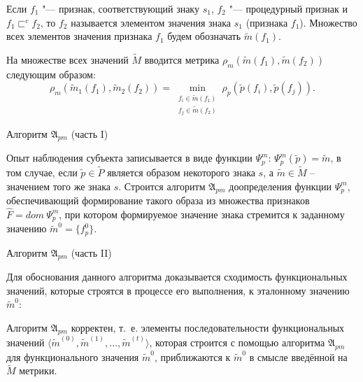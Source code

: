 \begin{Def}
	Если $f_1$ "--- признак, соответствующий знаку $s_1$, $f_2$ "--- процедурный признак и $f_1\sqsubset^c f_2$, то $f_2$ называется элементом значения знака $s_1$ (признака $f_1$). Множество всех элементов значения признака $f_1$ будем обозначать $\tilde m(f_1)$.
\end{Def}

На множестве всех значений $\tilde M$ вводится метрика $\rho_m(\tilde m(f_1),\tilde m(f_2))$ следующим образом:
\[
\rho_m(\tilde m_1(f_1),\tilde m_2(f_2 ))=\min\limits_{\substack{f_i\in\tilde m(f_1 )\\f_j\in\tilde m(f_2 )}}\rho_p(\tilde p(f_i ),\tilde p(f_j )).
\]

\begin{algorithm}[hS]
	\caption{Алгоритм $\mathfrak{A}_{pm}$ (часть I)}
	\label{alg:cycle_pm_start}
	\begin{algorithmic}[1]
		
	\end{algorithmic}
\end{algorithm} 

Опыт наблюдения субъекта записывается в виде функции $\Psi_p^m$: $\Psi_p^m(\tilde p)=\tilde m$, в том случае, если $\tilde p\in\tilde P$ является образом некоторого знака $s$, а $\tilde m\in\tilde M$ -- значением того же знака $s$. Строится алгоритм $\mathfrak A_{pm}$ доопределения функции $\Psi_p^m$, обеспечивающий формирование такого образа из множества признаков $\hat F=dom\ \Psi_p^m$, при котором формируемое значение знака стремится к заданному значению $\tilde m^0=\{f_p^0\}$.

\begin{algorithm}[h]
	\caption{Алгоритм $\mathfrak{A}_{pm}$ (часть II)}
	\label{alg:cycle_pm_end}
	\begin{algorithmic}[1]
		\algrestore{algst:store2}
		
	\end{algorithmic}
\end{algorithm}

Для обоснования данного алгоритма доказывается сходимость функциональных значений, которые строятся в процессе его выполнения, к эталонному значению $\tilde m^0$:

\begin{Theorem}
	Алгоритм $\mathfrak A_{pm}$ корректен, т.~е. элементы последовательности функциональных значений $\langle\tilde m^{(0)},\tilde m^{(1)},\dots,\tilde m^{(t)}\rangle$, которая строится с помощью алгоритма $\mathfrak A_{pm}$ для функционального значения $\tilde m^0$, приближаются к $\tilde m^0$ в смысле введённой на $\tilde M$ метрики.
\end{Theorem}

